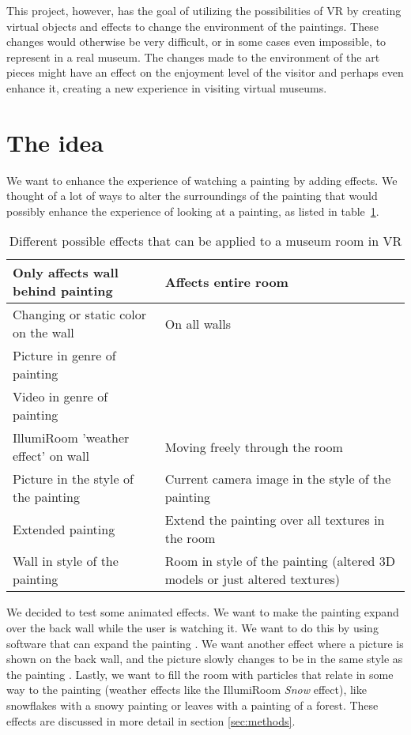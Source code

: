 \documentclass[a4paper]{article}
\begin{document}
This project, however, has the goal of utilizing the possibilities of VR by creating virtual objects and effects to change the environment of the paintings. These changes would otherwise be very difficult, or in some cases even impossible, to represent in a real museum. The changes made to the environment of the art pieces might have an effect on the enjoyment level of the visitor and perhaps even enhance it, creating a new experience in visiting virtual museums.


\section{The idea}
We want to enhance the experience of watching a painting by adding effects. We thought of a lot of ways to alter the surroundings of the painting that would possibly enhance the experience of looking at a painting, as listed in table~\ref{tab:effect_ideas}. 

\begin{table}
\begin{tabular}{ | l | p{6cm} | }
\hline
\textbf{Only affects wall behind painting} & \textbf{Affects entire room} \\\hline
Changing or static color on the wall & On all walls \\\hline
Picture in genre of painting & \\\hline
Video in genre of painting & \\\hline
IllumiRoom 'weather effect' on wall & Moving freely through the room  \\\hline
Picture in the style of the painting & Current camera image in the style of the painting \\\hline
Extended painting & Extend the painting over all textures in the room \\\hline
Wall in style of the painting & Room in style of the painting (altered 3D models or just altered textures) \\\hline
\end{tabular}
\caption{Different possible effects that can be applied to a museum room in VR}
\label{tab:effect_ideas}
\end{table}

We decided to test some animated effects. We want to make the painting expand over the back wall while the user is watching it. We want to do this by using software that can expand the painting \cite{inpainting}. We want another effect where a picture is shown on the back wall, and the picture slowly changes to be in the same style as the painting \cite{gatys}. Lastly, we want to fill the room with particles that relate in some way to the painting (weather effects like the IllumiRoom \emph{Snow} effect\cite{illumiroom}), like snowflakes with a snowy painting or leaves with a painting of a forest. These effects are discussed in more detail in section \ref{sec:methods}.
\end{document}
